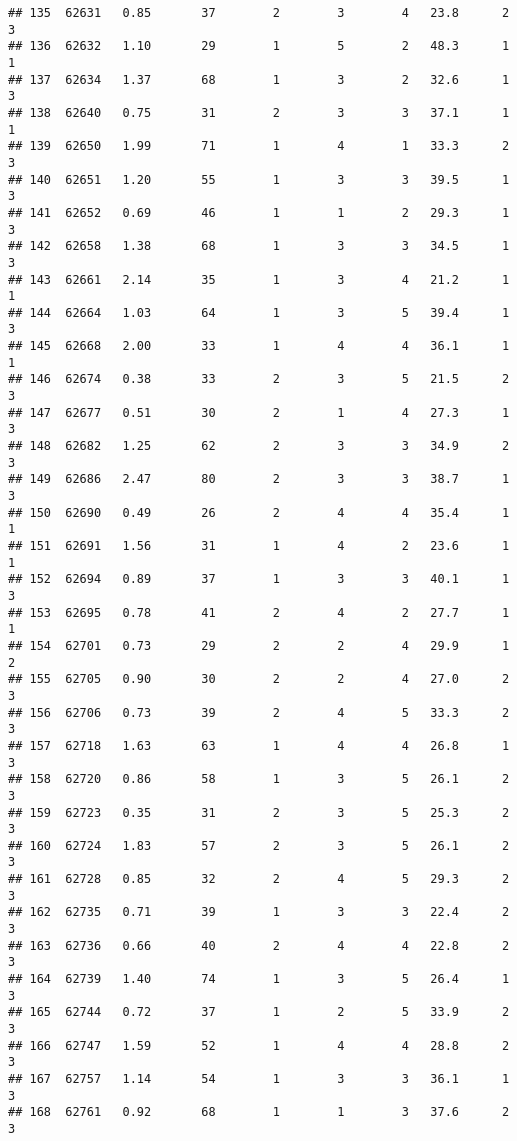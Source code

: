 \documentclass[
]{article}
\begin{document}
\begin{verbatim}
## 135  62631   0.85       37        2        3        4   23.8      2      3
## 136  62632   1.10       29        1        5        2   48.3      1      1
## 137  62634   1.37       68        1        3        2   32.6      1      3
## 138  62640   0.75       31        2        3        3   37.1      1      1
## 139  62650   1.99       71        1        4        1   33.3      2      3
## 140  62651   1.20       55        1        3        3   39.5      1      3
## 141  62652   0.69       46        1        1        2   29.3      1      3
## 142  62658   1.38       68        1        3        3   34.5      1      3
## 143  62661   2.14       35        1        3        4   21.2      1      1
## 144  62664   1.03       64        1        3        5   39.4      1      3
## 145  62668   2.00       33        1        4        4   36.1      1      1
## 146  62674   0.38       33        2        3        5   21.5      2      3
## 147  62677   0.51       30        2        1        4   27.3      1      3
## 148  62682   1.25       62        2        3        3   34.9      2      3
## 149  62686   2.47       80        2        3        3   38.7      1      3
## 150  62690   0.49       26        2        4        4   35.4      1      1
## 151  62691   1.56       31        1        4        2   23.6      1      1
## 152  62694   0.89       37        1        3        3   40.1      1      3
## 153  62695   0.78       41        2        4        2   27.7      1      1
## 154  62701   0.73       29        2        2        4   29.9      1      2
## 155  62705   0.90       30        2        2        4   27.0      2      3
## 156  62706   0.73       39        2        4        5   33.3      2      3
## 157  62718   1.63       63        1        4        4   26.8      1      3
## 158  62720   0.86       58        1        3        5   26.1      2      3
## 159  62723   0.35       31        2        3        5   25.3      2      3
## 160  62724   1.83       57        2        3        5   26.1      2      3
## 161  62728   0.85       32        2        4        5   29.3      2      3
## 162  62735   0.71       39        1        3        3   22.4      2      3
## 163  62736   0.66       40        2        4        4   22.8      2      3
## 164  62739   1.40       74        1        3        5   26.4      1      3
## 165  62744   0.72       37        1        2        5   33.9      2      3
## 166  62747   1.59       52        1        4        4   28.8      2      3
## 167  62757   1.14       54        1        3        3   36.1      1      3
## 168  62761   0.92       68        1        1        3   37.6      2      3

\end{verbatim}
\end{document}
